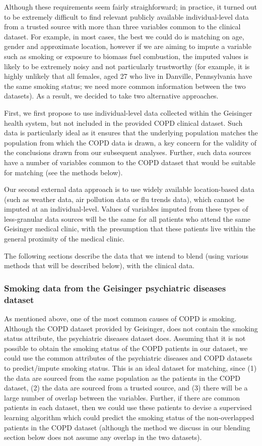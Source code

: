 \documentclass{article}
\begin{document}
Although these requirements seem fairly straighforward; in practice, it turned out to be extremely difficult to find relevant publicly available individual-level data from a trusted source with more than three variables common to the clinical dataset. For example, in most cases, the best we could do is matching on age, gender and approximate location, however if we are aiming to impute a variable such as smoking or exposure to biomass fuel combustion, the imputed values is likely to be extremely noisy and not particularly trustworthy (for example, it is highly unlikely that all females, aged 27 who live in Danville, Pennsylvania have the same smoking status; we need more common information between the two datasets). As a result, we decided to take two alternative approaches. 

First, we first propose to use individual-level data collected within the Geisinger health system, but not included in the provided COPD clinical dataset. Such data is particularly ideal as it ensures that the underlying population matches the population from which the COPD data is drawn, a key concern for the validity of the conclusions drawn from our subsequent analyses. Further, such data sources have a number of variables common to the COPD dataset that would be suitable for matching (see the methods below).

Our second external data approach is to use widely available location-based data (such as weather data, air pollution data or flu trends data), which cannot be imputed at an individual-level. Values of variables imputed from these types of less-granular data sources will be the same for all patients who attend the same Geisinger medical clinic, with the presumption that these patients live within the general proximity of the medical clinic.

The following sections describe the data that we intend to blend (using various methods that will be described below), with the clinical data.

\subsubsection{Smoking data from the Geisinger psychiatric diseases dataset}

As mentioned above, one of the most common causes of COPD is smoking. Although the COPD dataset provided by Geisinger, does not contain the smoking status attribute, the psychiatric diseases dataset does. Assuming that it is not possible to obtain the smoking status of the COPD patients in our dataset, we could use the common attributes of the psychiatric diseases and COPD datasets to predict/impute smoking status. This is an ideal dataset for matching, since (1) the data are sourced from the same population as the patients in the COPD dataset, (2) the data are sourced from a trusted source, and (3) there will be a large number of overlap between the variables. Further, if there are common patients in each dataset, then we could use these patients to devise a supervised learning algorithm which could predict the smoking status of the non-overlapped patients in the COPD dataset (although the method we discuss in our blending section below does not assume any overlap in the two datasets).
\end{document}
